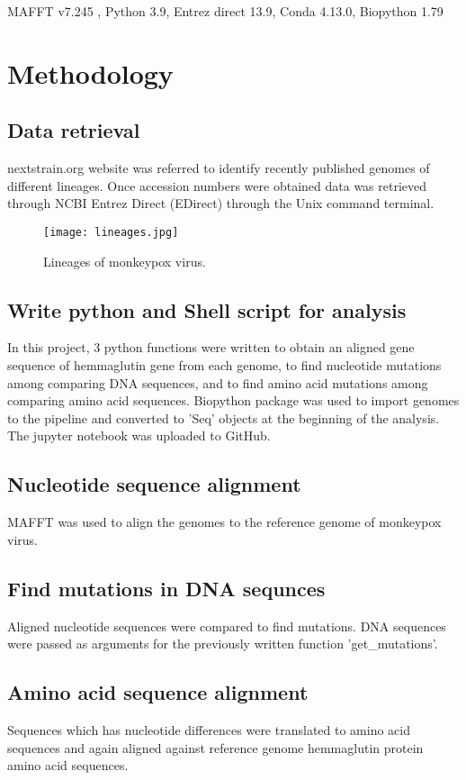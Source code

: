 \documentclass[fleqn,10pt]{olplainarticle}
\begin{document}
MAFFT v7.245
, Python 3.9, 
Entrez direct 13.9, 
Conda 4.13.0, 
Biopython 1.79


\section*{Methodology}

\subsection*{Data retrieval}

nextstrain.org website was referred to identify recently published genomes of different lineages. 
Once accession numbers were obtained data was retrieved through NCBI Entrez Direct (EDirect) through the Unix command terminal.

\begin{figure}[ht]
\centering
\texttt{[image: lineages.jpg]}
\caption{Lineages of monkeypox virus.}
\label{fig:view}
\end{figure}


\subsection*{Write python and Shell script for analysis}
In this project, 3 python functions were written to obtain an aligned gene sequence of hemmaglutin gene from each genome, to find nucleotide mutations among comparing DNA sequences, and to find amino acid mutations among comparing amino acid sequences. Biopython package was used to import genomes to the pipeline and converted to 'Seq' objects at the beginning of the analysis. The jupyter notebook was uploaded to GitHub. 


\subsection*{Nucleotide sequence alignment}

MAFFT was used to align the genomes to the reference genome of monkeypox virus.


\subsection*{Find mutations in DNA sequnces}
Aligned nucleotide sequences were compared to find mutations. DNA sequences were passed as arguments for the previously written function 'get\_mutations'. 


\subsection*{Amino acid sequence alignment}
Sequences which has nucleotide differences were translated to amino acid sequences and again aligned against reference genome hemmaglutin protein amino acid sequences.
\end{document}
